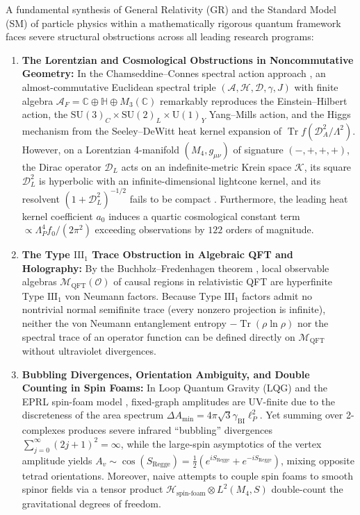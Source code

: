 \documentclass[11pt,a4paper]{article}
\theoremstyle{plain}
\theoremstyle{definition}
\theoremstyle{remark}
\newcommand{\Tr}{\operatorname{Tr}}
\newcommand{\SU}{\mathrm{SU}}
\newcommand{\U}{\mathrm{U}}
\newcommand{\M}{\mathcal{M}}
\newcommand{\K}{\mathcal{K}}
\newcommand{\Hilb}{\mathcal{H}}
\newcommand{\A}{\mathcal{A}}
\newcommand{\D}{\mathcal{D}}
\newcommand{\C}{\mathbb{C}}
\newcommand{\Quat}{\mathbb{H}}
\begin{document}
A fundamental synthesis of General Relativity (GR) and the Standard Model (SM) of particle physics within a mathematically rigorous quantum framework faces severe structural obstructions across all leading research programs:
\begin{enumerate}[label=(\arabic*)]
  \item \textbf{The Lorentzian and Cosmological Obstructions in Noncommutative Geometry:} In the Chamseddine--Connes spectral action approach \cite{Connes1996,ChamseddineConnes2007,Connes2013}, an almost-commutative Euclidean spectral triple $(\A, \Hilb, \D, \gamma, J)$ with finite algebra $\A_F = \C \oplus \Quat \oplus M_3(\C)$ remarkably reproduces the Einstein--Hilbert action, the $\SU(3)_C \times \SU(2)_L \times \U(1)_Y$ Yang--Mills action, and the Higgs mechanism from the Seeley--DeWitt heat kernel expansion of $\Tr f(\D_A^2/\Lambda^2)$. However, on a Lorentzian 4-manifold $(M_4, g_{\mu\nu})$ of signature $(-,+,+,+)$, the Dirac operator $\D_L$ acts on an indefinite-metric Krein space $\K$, its square $\D_L^2$ is hyperbolic with an infinite-dimensional lightcone kernel, and its resolvent $(1+\D_L^2)^{-1/2}$ fails to be compact \cite{Barrett2015,VanDenDungen2016}. Furthermore, the leading heat kernel coefficient $a_0$ induces a quartic cosmological constant term $\propto \Lambda_P^4 f_0 / (2\pi^2)$ exceeding observations by $122$ orders of magnitude.
  \item \textbf{The Type $\mathrm{III}_1$ Trace Obstruction in Algebraic QFT and Holography:} By the Buchholz--Fredenhagen theorem \cite{Haag1996}, local observable algebras $\M_{\mathrm{QFT}}(\mathcal{O})$ of causal regions in relativistic QFT are hyperfinite Type $\mathrm{III}_1$ von Neumann factors. Because Type $\mathrm{III}_1$ factors admit no nontrivial normal semifinite trace (every nonzero projection is infinite), neither the von Neumann entanglement entropy $-\Tr(\rho \ln \rho)$ nor the spectral trace of an operator function can be defined directly on $\M_{\mathrm{QFT}}$ without ultraviolet divergences.
  \item \textbf{Bubbling Divergences, Orientation Ambiguity, and Double Counting in Spin Foams:} In Loop Quantum Gravity (LQG) and the EPRL spin-foam model \cite{Rovelli2004,Engle2008}, fixed-graph amplitudes are UV-finite due to the discreteness of the area spectrum $\Delta A_{\min} = 4\pi\sqrt{3}\gamma_{\mathrm{BI}}\ell_P^2$. Yet summing over 2-complexes produces severe infrared ``bubbling'' divergences $\sum_{j=0}^\infty (2j+1)^2 = \infty$, while the large-spin asymptotics of the vertex amplitude yields $A_v \sim \cos(S_{\mathrm{Regge}}) = \frac{1}{2}(e^{i S_{\mathrm{Regge}}} + e^{-i S_{\mathrm{Regge}}})$, mixing opposite tetrad orientations. Moreover, naive attempts to couple spin foams to smooth spinor fields via a tensor product $\Hilb_{\mathrm{spin\text{-}foam}} \otimes L^2(M_4, S)$ double-count the gravitational degrees of freedom.

\end{enumerate}
\end{document}
